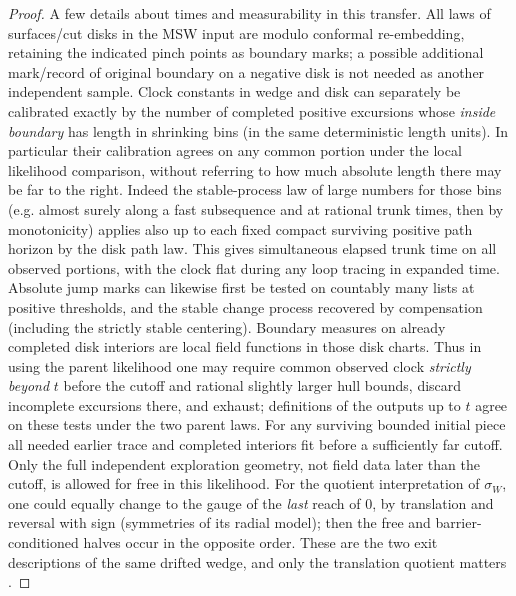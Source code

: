 \begin{proof}

A few details about times and measurability in this transfer.
All laws of surfaces/cut disks in the MSW input are modulo conformal re-embedding, retaining the indicated pinch points as boundary marks; a possible additional mark/record of original boundary on a negative disk is not needed as another independent sample.
Clock constants in wedge and disk can separately be calibrated exactly by the number of completed positive excursions whose \emph{inside boundary} has length in shrinking bins (in the same deterministic length units).
In particular their calibration agrees on any common portion under the local likelihood comparison, without referring to how much absolute length there may be far to the right.
Indeed the stable-process law of large numbers for those bins (e.g. almost surely along a fast subsequence and at rational trunk times, then by monotonicity) applies also up to each fixed compact surviving positive path horizon by the disk path law.
This gives simultaneous elapsed trunk time on all observed portions, with the clock flat during any loop tracing in expanded time.
Absolute jump marks can likewise first be tested on countably many lists at positive thresholds, and the stable change process recovered by compensation (including the strictly stable centering).
Boundary measures on already completed disk interiors are local field functions in those disk charts.
Thus in using the parent likelihood one may require common observed clock \emph{strictly beyond} \(t\) before the cutoff and rational slightly larger hull bounds, discard incomplete excursions there, and exhaust; definitions of the outputs up to \(t\) agree on these tests under the two parent laws.
For any surviving bounded initial piece all needed earlier trace and completed interiors fit before a sufficiently far cutoff.
Only the full independent exploration geometry, not field data later than the cutoff, is allowed for free in this likelihood.
For the quotient interpretation of \(\sigma_W\), one could equally change to the gauge of the \emph{last} reach of 0, by translation and reversal with sign (symmetries of its radial model); then the free and barrier-conditioned halves occur in the opposite order.
These are the two exit descriptions of the same drifted wedge, and only the translation quotient matters \citep{MSWQuantum}.


\end{proof}
